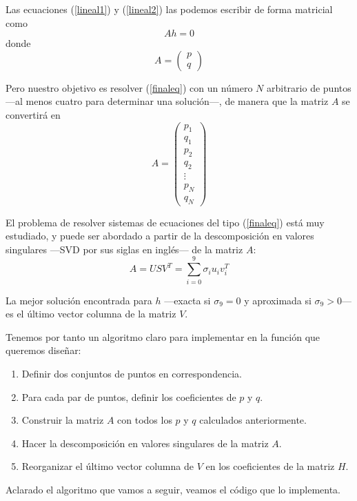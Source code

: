 \documentclass[a4paper, 11pt]{article}
\theoremstyle{definition}
\theoremstyle{theorem}
\begin{document}
  Las ecuaciones (\ref{lineal1}) y (\ref{lineal2}) las podemos escribir de forma matricial como
  \begin{equation}
      Ah = 0 \label{finaleq}
  \end{equation}
  donde
  \[
  A = \begin{pmatrix}
      p \\
      q
  \end{pmatrix}
  \]

  Pero nuestro objetivo es resolver (\ref{finaleq}) con un número $N$ arbitrario de puntos ---al menos cuatro para determinar una solución---, de manera que la matriz $A$ se convertirá en
  \[
  A = \begin{pmatrix}
      p_1 \\
      q_1 \\
      p_2 \\
      q_2 \\
      \vdots  \\
      p_N \\
      q_N
  \end{pmatrix}
  \]

  El problema de resolver sistemas de ecuaciones del tipo (\ref{finaleq}) está muy estudiado, y puede ser abordado a partir de la descomposición en valores singulares ---SVD por sus siglas en inglés--- de la matriz $A$:
  \[
  A = USV^T = \sum_{i=0}^9 \sigma_i u_i v_i^T
  \]

  La mejor solución encontrada para $h$ ---exacta si $\sigma_9=0$ y aproximada si $\sigma_9 > 0$--- es el último vector columna de la matriz $V$.

  Tenemos por tanto un algoritmo claro para implementar en la función que queremos diseñar:
  \begin{enumerate}
      \item Definir dos conjuntos de puntos en correspondencia.
      \item Para cada par de puntos, definir los coeficientes de $p$ y $q$.
      \item Construir la matriz $A$ con todos los $p$ y $q$ calculados anteriormente.
      \item Hacer la descomposición en valores singulares de la matriz $A$.
      \item Reorganizar el último vector columna de $V$ en los coeficientes de la matriz $H$.
  \end{enumerate}

  Aclarado el algoritmo que vamos a seguir, veamos el código que lo implementa.
\end{document}
